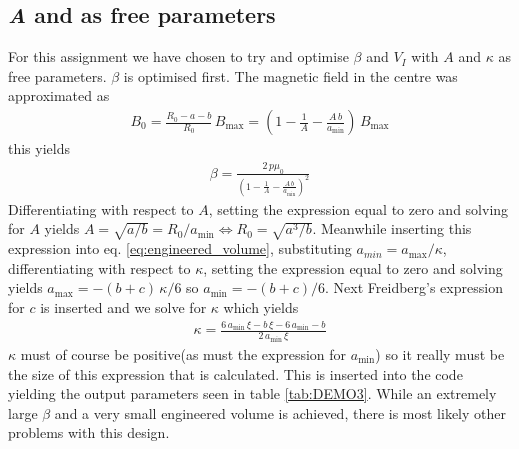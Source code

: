 \subsection{\textit{A} and \mathinhead{\kappa}{\kappa} as free parameters}

For this assignment we have chosen to try and optimise $\beta$ and $V_{\si{I}}$ with $A$ and $\kappa$ as free parameters. $\beta$ is optimised first. The magnetic field in the centre was approximated as
\begin{align}
	B_{0}=\frac{R_{0}-a-b}{R_{0}}\,B_{\max}=(1-\frac{1}{A}-\frac{A\, b}{a_{\min}})\, B_{\max}
\end{align}
this yields
\begin{align}
	\beta=\frac{2\, p\mu_{0}}{(1-\frac{1}{A}-\frac{A\, b}{a_{\min}})^{2}}
\end{align}
Differentiating with respect to $A$, setting the expression equal to zero and solving for $A$ yields $A=\sqrt{a/b}=R_{0}/a_{\min}\Leftrightarrow R_{0}=\sqrt{a^{3}/b}$. Meanwhile inserting this expression into eq.
\ref{eq:engineered_volume}, substituting $a_{min}=a_{\max}/\kappa$,
differentiating with respect to $\kappa$, setting the expression equal to zero and solving yields $a_{\max}=-(b+c)\,\kappa/6$ so $a_{\min}=-(b+c)/6$. Next Freidberg's expression for $c$ is inserted and we solve for $\kappa$ which yields
\begin{align}
	\kappa=\frac{6\, a_{\min}\,\xi-b\,\xi-6\, a_{\min}-b}{2\,a_{\min}\,\xi}
\end{align}
$\kappa$ must of course be positive(as must the expression for $a_{\min}$) so it really must be the size of this expression that is calculated. This is inserted into the code yielding the output parameters seen in table \ref{tab:DEMO3}. While an extremely large $\beta$ and a very small engineered volume is achieved, there is most likely other problems with this design.
